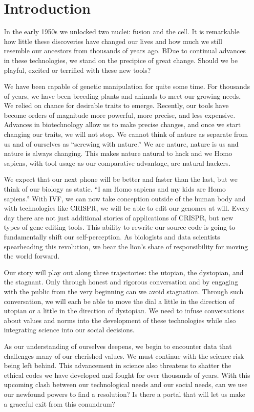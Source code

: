 \section{Introduction}
\label{sec:introduction}

In the early 1950s we unlocked two nuclei: fusion and the cell.
It is remarkable how little these discoveries have changed our lives and how much we still resemble our ancestors from thousands of years ago.
BDue to continual advances in these technologies, we stand on the precipice of great change.
Should we be playful, excited or terrified with these new tools?

We have been capable of genetic manipulation for quite some time.
For thousands of years, we have been breeding plants and animals to meet our growing needs.
We relied on chance for desirable traits to emerge.
Recently, our tools have become orders of magnitude more powerful, more precise, and less expensive.
Advances in biotechnology allow us to make precise changes, and once we start changing our traits, we will not stop.
We cannot think of nature as separate from us and of ourselves as ``screwing with nature.''
We are nature, nature is us and nature is always changing.
This makes nature natural to hack and we Homo sapiens, with tool usage as our comparative advantage, are natural hackers.

We expect that our next phone will be better and faster than the last, but we think of our biology as static.
``I am Homo sapiens and my kids are Homo sapiens.''
With IVF, we can now take conception outside of the human body and with technologies like CRISPR, we will be able to edit our genomes at will.
Every day there are not just additional stories of applications of CRISPR, but new types of gene-editing tools.
This ability to rewrite our source-code is going to fundamentally shift our self-perception.
As biologists and data scientists spearheading this revolution, we bear the lion's share of responsibility for moving the world forward.

Our story will play out along three trajectories: the utopian, the dystopian, and the stagnant.
Only through honest and rigorous conversation and by engaging with the public from the very beginning can we avoid stagnation.
Through such conversation, we will each be able to move the dial a little in the direction of utopian or a little in the direction of dystopian.
We need to infuse conversations about values and norms into the development of these technologies while also integrating science into our social decisions.

As our understanding of ourselves deepens, we begin to encounter data that challenges many of our cherished values.
We must continue with the science risk being left behind.
This advancement in science also threatens to shatter the ethical codes we have developed and fought for over thousands of years.
With this upcoming clash between our technological needs and our social needs, can we use our newfound powers to find a resolution?
Is there a portal that will let us make a graceful exit from this conundrum?
